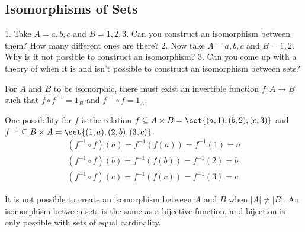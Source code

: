 \subsection{Isomorphisms of Sets}
\begin{ttta}
	1. Take $A = {a, b, c}$ and $B = {1, 2, 3}$. Can you construct an isomorphism
	between them? How many different ones are there?
	2. Now take $A = {a, b, c}$ and $B = {1, 2}$. Why is it not possible to
	construct an isomorphism?
	3. Can you come up with a theory of when it is and isn’t possible to construct
	an isomorphism between sets?
\end{ttta}
\begin{proofitem}
	\item For $A$ and $B$ to be isomorphic, there must exist an invertible function
	$f: A\rightarrow B$ such that $f\circ f^{-1} = 1_B$ and $f^{-1}\circ f=1_A$.
	\item One possibility for $f$ is the relation $f\subseteq A\times B=\set{(a, 1),
			(b, 2), (c, 3)}$ and $f^{-1}\subseteq B\times A=\set{(1, a), (2, b), (3,
			c)}$.
	\begin{align*}
		(f^{-1}\circ f)(a) = f^{-1}(f(a)) = f^{-1}(1) = a \\
		(f^{-1}\circ f)(b) = f^{-1}(f(b)) = f^{-1}(2) = b \\
		(f^{-1}\circ f)(c) = f^{-1}(f(c)) = f^{-1}(3) = c
	\end{align*}
	\item It is not possible to create an isomorphism between $A$ and $B$ when
	$|A|\neq|B|$. An isomorphism between sets is the same as a bijective
	function, and bijection is only possible with sets of equal cardinality.
\end{proofitem}
\clearpage

